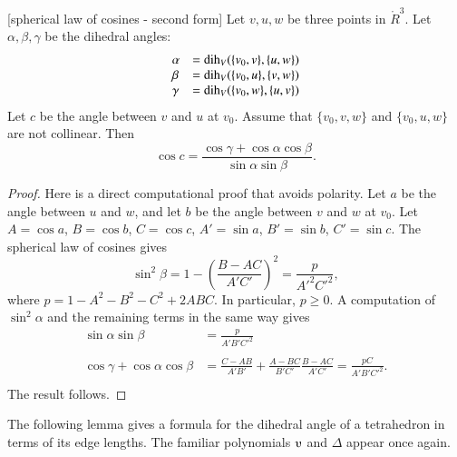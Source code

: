 \begin{lemma}[spherical law of cosines - second form]
Let $v,u,w$ be three points in $\ring{R}^3$.
Let $\alpha,\beta,\gamma$ be the dihedral angles: 
   $$
   \begin{array}{lll}
     \alpha &= \operatorname{dih}_V(\{v_0,v\},\{u,w\})\\
     \beta &= \operatorname{dih}_V(\{v_0,u\},\{v,w\})\\
     \gamma&= \operatorname{dih}_V(\{v_0,w\},\{u,v\})\\
     \end{array}
   $$
Let $c$ be the
angle between $v$ and $u$ at $v_0$. 
Assume that $\{v_0,v,w\}$ and $\{v_0,u,w\}$ are not collinear.
Then
    $$
    \cos c = \frac{\cos \gamma + \cos \alpha \cos \beta}
     {\sin \alpha\sin \beta}.
    $$
\end{lemma}

\begin{proof}  
Here is a direct
computational proof that avoids polarity.
Let $a$ be the angle between $u$ and $w$, and let $b$ be the angle
between $v$ and $w$ at $v_0$.
Let $A=\cos a$, $B=\cos b$, $C=\cos c$,
$A'=\sin a$, $B'=\sin b$, $C'=\sin c$.  The
spherical law of cosines gives
   $$\sin^2\beta = 1-\left(\frac{B-A C}{A' C'}\right)^2
     = \frac{p}{A'^2 C'^2},$$
where $p=1-A^2 - B^2 - C^2 + 2 A B C$.
In particular, $p\ge 0$.
A computation of $\sin^2\alpha$ and the remaining terms in the same way gives
   $$
   \begin{array}{lll}
     \sin\alpha\sin\beta &= \frac{\displaystyle p}{\displaystyle A' B' C'^2}\\ 
      \\
     \cos\gamma + \cos\alpha \cos\beta &=
         \frac{\displaystyle C - A B}{\displaystyle A' B'} + \frac{\displaystyle A - B C}{\displaystyle B' C'} \frac{\displaystyle B - A C}{\displaystyle A' C'}
         = \frac{\displaystyle p C}{\displaystyle A' B' C'^2}.\\
   \end{array}
   $$
The result follows.
\end{proof}

The following lemma gives a formula for the dihedral angle
of a tetrahedron in terms of its edge lengths.  The
familiar polynomials $\ups$ and $\Delta$ appear once again.


